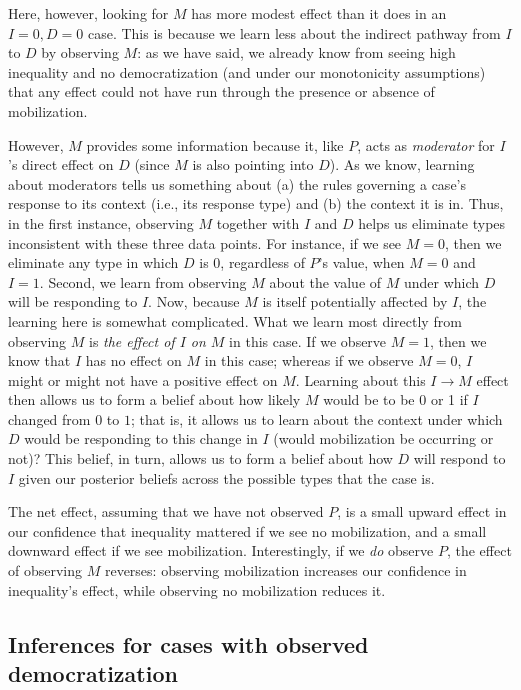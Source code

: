 \documentclass[12pt,]{book}
\begin{document}
Here, however, looking for \(M\) has more modest effect than it does in an \(I=0, D=0\) case. This is because we learn less about the indirect pathway from \(I\) to \(D\) by observing \(M\): as we have said, we already know from seeing high inequality and no democratization (and under our monotonicity assumptions) that any effect could not have run through the presence or absence of mobilization.

However, \(M\) provides some information because it, like \(P\), acts as \emph{moderator} for \(I\)'s direct effect on \(D\) (since \(M\) is also pointing into \(D\)). As we know, learning about moderators tells us something about (a) the rules governing a case's response to its context (i.e., its response type) and (b) the context it is in. Thus, in the first instance, observing \(M\) together with \(I\) and \(D\) helps us eliminate types inconsistent with these three data points. For instance, if we see \(M=0\), then we eliminate any type in which \(D\) is 0, regardless of \(P\)'s value, when \(M=0\) and \(I=1\). Second, we learn from observing \(M\) about the value of \(M\) under which \(D\) will be responding to \(I\). Now, because \(M\) is itself potentially affected by \(I\), the learning here is somewhat complicated. What we learn most directly from observing \(M\) is \emph{the effect of \(I\) on \(M\)} in this case. If we observe \(M=1\), then we know that \(I\) has no effect on \(M\) in this case; whereas if we observe \(M=0\), \(I\) might or might not have a positive effect on \(M\). Learning about this \(I \rightarrow M\) effect then allows us to form a belief about how likely \(M\) would be to be 0 or 1 if \(I\) changed from \(0\) to \(1\); that is, it allows us to learn about the context under which \(D\) would be responding to this change in \(I\) (would mobilization be occurring or not)? This belief, in turn, allows us to form a belief about how \(D\) will respond to \(I\) given our posterior beliefs across the possible types that the case is.

The net effect, assuming that we have not observed \(P\), is a small upward effect in our confidence that inequality mattered if we see no mobilization, and a small downward effect if we see mobilization. Interestingly, if we \emph{do} observe \(P\), the effect of observing \(M\) reverses: observing mobilization increases our confidence in inequality's effect, while observing no mobilization reduces it.

\hypertarget{inferences-for-cases-with-observed-democratization}{%
\subsection{Inferences for cases with observed democratization}\label{inferences-for-cases-with-observed-democratization}}
\end{document}
